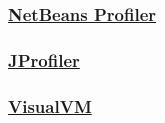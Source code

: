 

\subsubsection{\href{https://profiler.netbeans.org/}{NetBeans Profiler}}



\subsubsection{\href{https://www.ej-technologies.com/products/jprofiler/overview.html}{JProfiler}}



\subsubsection{\href{http://visualvm.github.io/}{VisualVM}}




